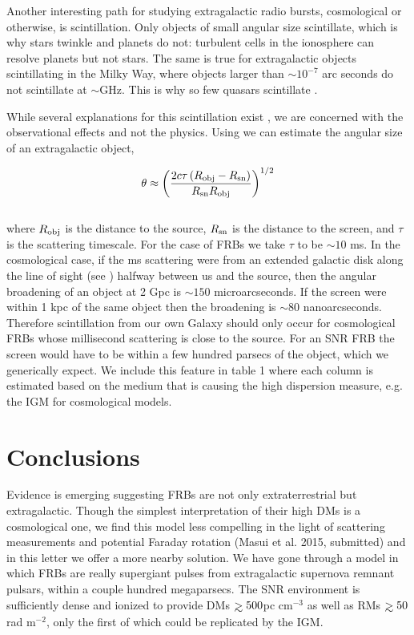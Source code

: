 \documentclass[useAMS,usenatbib]{mn2e}
\def\gtrsim{\mathrel{\hbox{\rlap{\hbox{\lower4pt\hbox{$\sim$}}}\hbox{$>$}}}}
\begin{document}
Another interesting path for studying extragalactic radio bursts, 
cosmological or otherwise, is scintillation. Only objects of small angular
size scintillate, which is why stars twinkle and planets do not: turbulent cells
in the ionosphere can resolve planets but not stars. The same is true for extragalactic
objects scintillating in the Milky Way, where objects larger than $\sim10^{-7}$ 
arc seconds do not scintillate at $\sim$GHz. 
This is why so few quasars scintillate \citep{2002Natur.415...57D}. 

While several explanations for this scintillation exist 
\citep{1992RSPTA.341..151N, 2014MNRAS.442.3338P}, we are  
concerned with the observational effects and not the physics. 
Using \cite{1986isra.book.....T} 
we can estimate the angular size of an extragalactic object,

\begin{equation}
\label{eqn-scint}
\theta \approx \left ( \frac{2 c \tau \, (R_{\rm obj} - R_{\rm sn})}{R_{\rm sn}R_{\rm obj}} \right )^{1/2}
\end{equation}
\\

\noindent where $R_{\rm obj}$ is the distance to the source, $R_{\rm sn}$ is the distance 
to the screen, and $\tau$ is the scattering timescale. For the case of FRBs we 
take $\tau$ to be $\sim10$ ms. In the cosmological case, if the ms scattering
were from an extended galactic disk along the line of sight  (see \citet{2014ApJ...780L..33M})
halfway between
us and the source, then the angular broadening
of an object at 2 Gpc is $\sim150$ microarcseconds. If the screen were within 
1 kpc of the same object then the broadening is $\sim80$ nanoarcseconds. 
Therefore scintillation from our own Galaxy should only occur for cosmological 
FRBs whose millisecond scattering is close to the source. For an SNR FRB the 
screen would have to be within a few hundred parsecs of the object, which we 
generically expect. We include this feature in table 1 where each 
column is estimated based on the medium that is causing the high dispersion measure, 
e.g. the IGM for cosmological models.


\section{Conclusions}
Evidence is emerging suggesting FRBs are not only extraterrestrial
but extragalactic. Though the simplest interpretation of their high DMs 
is a cosmological one, we find this model less compelling in the light of 
scattering measurements and potential Faraday rotation (Masui et al. 2015, submitted)
and in this letter we offer a 
more nearby solution. 
We have gone through
a model in which FRBs are really supergiant pulses from 
extragalactic supernova remnant pulsars, within a couple hundred megaparsecs. 
The SNR environment is sufficiently
dense and ionized to provide DMs $\gtrsim 500$pc cm$^{-3}$ as well as 
RMs $\gtrsim 50$ rad m$^{-2}$, only the first of which could be replicated by the IGM. 
\end{document}
